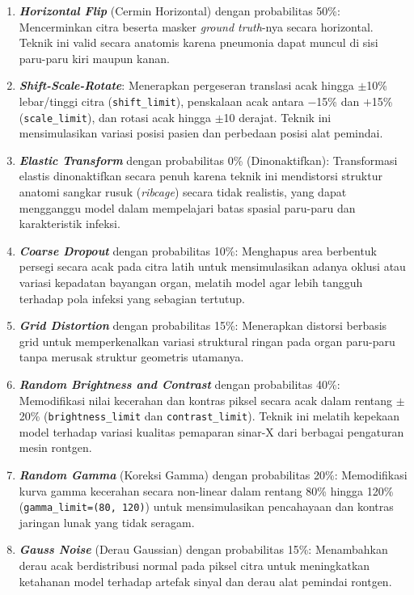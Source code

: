 \documentclass[12pt,a4paper,oneside]{book}
\begin{document}
\begin{enumerate}
  \item \textbf{\textit{Horizontal Flip}} (Cermin Horizontal) dengan probabilitas 50\%: Mencerminkan citra beserta masker \textit{ground truth}-nya secara horizontal. Teknik ini valid secara anatomis karena pneumonia dapat muncul di sisi paru-paru kiri maupun kanan.
  \item \textbf{\textit{Shift-Scale-Rotate}}: Menerapkan pergeseran translasi acak hingga $\pm$10\% lebar/tinggi citra (\texttt{shift\_limit}), penskalaan acak antara $-$15\% dan $+$15\% (\texttt{scale\_limit}), dan rotasi acak hingga $\pm$10 derajat. Teknik ini mensimulasikan variasi posisi pasien dan perbedaan posisi alat pemindai.
  \item \textbf{\textit{Elastic Transform}} dengan probabilitas 0\% (Dinonaktifkan): Transformasi elastis dinonaktifkan secara penuh karena teknik ini mendistorsi struktur anatomi sangkar rusuk (\textit{ribcage}) secara tidak realistis, yang dapat mengganggu model dalam mempelajari batas spasial paru-paru dan karakteristik infeksi.
  \item \textbf{\textit{Coarse Dropout}} dengan probabilitas 10\%: Menghapus area berbentuk persegi secara acak pada citra latih untuk mensimulasikan adanya oklusi atau variasi kepadatan bayangan organ, melatih model agar lebih tangguh terhadap pola infeksi yang sebagian tertutup.
  \item \textbf{\textit{Grid Distortion}} dengan probabilitas 15\%: Menerapkan distorsi berbasis grid untuk memperkenalkan variasi struktural ringan pada organ paru-paru tanpa merusak struktur geometris utamanya.
  \item \textbf{\textit{Random Brightness and Contrast}} dengan probabilitas 40\%: Memodifikasi nilai kecerahan dan kontras piksel secara acak dalam rentang $\pm$20\% (\texttt{brightness\_limit} dan \texttt{contrast\_limit}). Teknik ini melatih kepekaan model terhadap variasi kualitas pemaparan sinar-X dari berbagai pengaturan mesin rontgen.
  \item \textbf{\textit{Random Gamma}} (Koreksi Gamma) dengan probabilitas 20\%: Memodifikasi kurva gamma kecerahan secara non-linear dalam rentang 80\% hingga 120\% (\texttt{gamma\_limit=(80, 120)}) untuk mensimulasikan pencahayaan dan kontras jaringan lunak yang tidak seragam.
  \item \textbf{\textit{Gauss Noise}} (Derau Gaussian) dengan probabilitas 15\%: Menambahkan derau acak berdistribusi normal pada piksel citra untuk meningkatkan ketahanan model terhadap artefak sinyal dan derau alat pemindai rontgen.
\end{enumerate}
\end{document}
